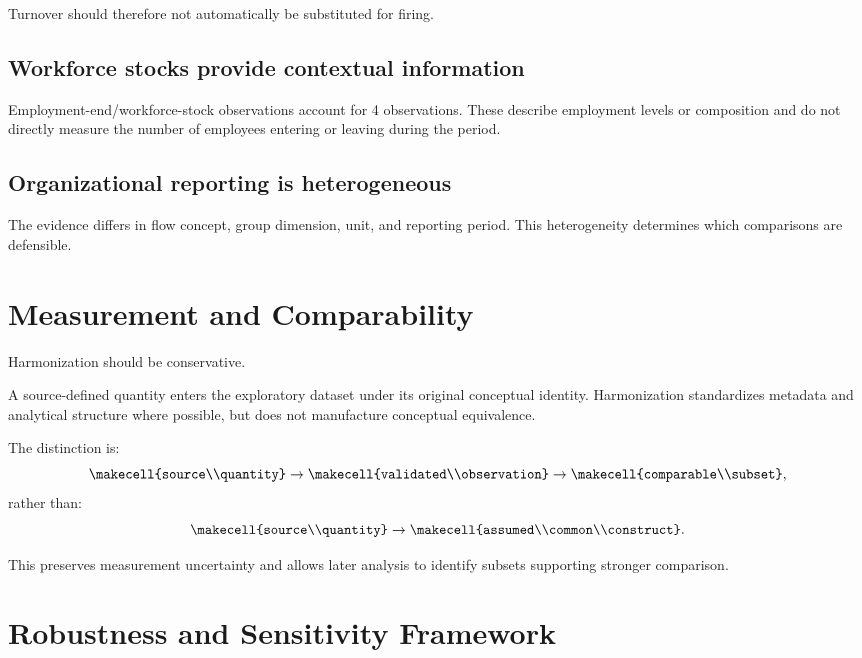 \documentclass[a4paper,10pt]{article}
\begin{document}
Turnover should therefore not automatically be substituted for firing.

\subsection{Workforce stocks provide contextual information}

Employment-end/workforce-stock observations account for 4 observations. These describe employment levels or composition and do not directly measure the number of employees entering or leaving during the period.

\subsection{Organizational reporting is heterogeneous}

The evidence differs in flow concept, group dimension, unit, and reporting period. This heterogeneity determines which comparisons are defensible.

\section{Measurement and Comparability}

Harmonization should be conservative.

A source-defined quantity enters the exploratory dataset under its original conceptual identity. Harmonization standardizes metadata and analytical structure where possible, but does not manufacture conceptual equivalence.

The distinction is:
\begin{equation}
\makecell{source\\quantity}
\rightarrow
\makecell{validated\\observation}
\rightarrow
\makecell{comparable\\subset},
\end{equation}
rather than:
\begin{equation}
\makecell{source\\quantity}
\rightarrow
\makecell{assumed\\common\\construct}.
\end{equation}

This preserves measurement uncertainty and allows later analysis to identify subsets supporting stronger comparison.

\section{Robustness and Sensitivity Framework}
\end{document}

